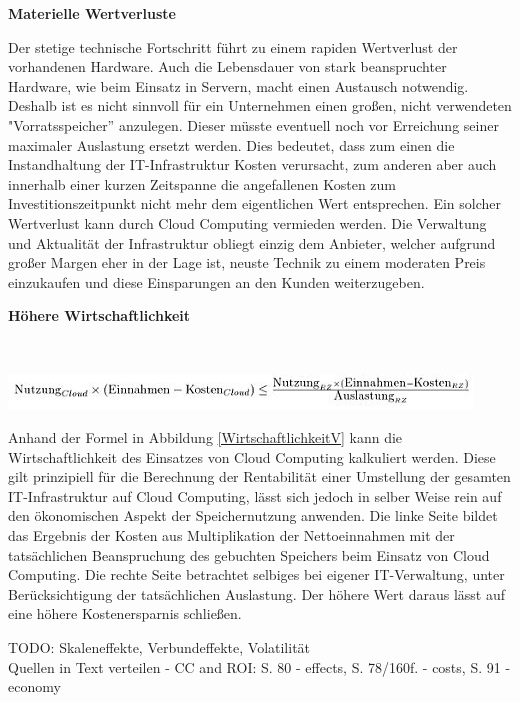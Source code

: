 \documentclass[12pt,a4paper,bibliography=totocnumbered,listof=totocnumbered]{scrartcl}
\begin{document}
\textbf{Materielle Wertverluste}

Der stetige technische Fortschritt führt zu einem rapiden Wertverlust der vorhandenen Hardware. Auch die Lebensdauer von stark beanspruchter Hardware, wie beim Einsatz in Servern, macht einen Austausch notwendig. Deshalb ist es nicht sinnvoll für ein Unternehmen einen großen, nicht verwendeten "Vorratsspeicher'' anzulegen. Dieser müsste eventuell noch vor Erreichung seiner maximaler Auslastung ersetzt werden. Dies bedeutet, dass zum einen die Instandhaltung der IT-Infrastruktur Kosten verursacht, zum anderen aber auch innerhalb einer kurzen Zeitspanne die angefallenen Kosten zum Investitionszeitpunkt nicht mehr dem eigentlichen Wert entsprechen. Ein solcher Wertverlust kann durch Cloud Computing vermieden werden. Die Verwaltung und Aktualität der Infrastruktur obliegt einzig dem Anbieter, welcher aufgrund großer Margen eher in der Lage ist, neuste Technik zu einem moderaten Preis einzukaufen und diese Einsparungen an den Kunden weiterzugeben.

\textbf{Höhere Wirtschaftlichkeit}

\vspace{1em}
$\;$\\
\begin{minipage}{\linewidth}
	\centering
	\includegraphics[width=1.0\linewidth]{./img/Wirtschaftlichkeit.jpg}
 	\label{WirtschaftlichkeitV}
\end{minipage}
\vspace{1em}

Anhand der Formel in Abbildung \ref{WirtschaftlichkeitV} kann die Wirtschaftlichkeit des Einsatzes von Cloud Computing kalkuliert werden. Diese gilt prinzipiell für die Berechnung der Rentabilität einer Umstellung der gesamten IT-Infrastruktur auf Cloud Computing, lässt sich jedoch in selber Weise rein auf den ökonomischen Aspekt der Speichernutzung anwenden. Die linke Seite bildet das Ergebnis der Kosten aus Multiplikation der Nettoeinnahmen mit der tatsächlichen Beanspruchung des gebuchten Speichers beim Einsatz von Cloud Computing. Die rechte Seite betrachtet selbiges bei eigener IT-Verwaltung, unter Berücksichtigung der tatsächlichen Auslastung. Der höhere Wert daraus lässt auf eine höhere Kostenersparnis schließen.

TODO: Skaleneffekte, Verbundeffekte, Volatilität\\
Quellen in Text verteilen - CC and ROI: S. 80 - effects, S. 78/160f. -  costs, S. 91 - economy
\end{document}
